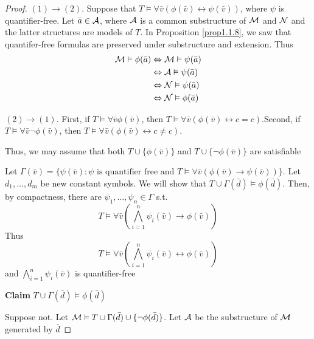 \documentclass[11pt]{article}
\begin{document}
\begin{proof}
\((1)\to(2)\). Suppose that \(T\vDash\forall\bar{v}(\phi(\bar{v})\leftrightarrow\psi(\bar{v}))\),
where \(\psi\) is quantifier-free. Let \(\bar{a}\in\mathcal{A}\), where \(\mathcal{A}\) is a
common substructure of \(\mathcal{M}\) and \(\mathcal{N}\) and the latter structures are
models of \(T\). In Proposition \ref{prop1.1.8}, we saw that quantifer-free
formulas are preserved under substructure and extension. Thus
\begin{align*}
\mathcal{M}\vDash\phi(\bar{a})&\Leftrightarrow\mathcal{M}\vDash\psi(\bar{a})\\
&\Leftrightarrow\mathcal{A}\vDash\psi(\bar{a})\\
&\Leftrightarrow\mathcal{N}\vDash\psi(\bar{a})\\
&\Leftrightarrow\mathcal{N}\vDash\phi(\bar{a})
\end{align*}

\((2)\to(1)\). First, if \(T\vDash\forall\bar{v}\phi(\bar{v})\), then
\(T\vDash\forall\bar{v}(\phi(\bar{v})\leftrightarrow c=c)\).Second, if
\(T\vDash\forall\bar{v}\neg\phi(\bar{v})\), then
\(T\vDash\forall\bar{v}(\phi(\bar{v})\leftrightarrow c\neq c)\).

Thus, we may assume that both \(T\cup\{\phi(\bar{v})\}\) and \(T\cup\{\neg\phi(\bar{v})\}\)
are satisfiable

Let  \(\Gamma(\bar{v})=\{\psi(\bar{v}):\psi\text{ is quantifier free and }T\vDash\forall\bar{v}(\phi(\bar{v})\to\psi(\bar{v}))\}\).
Let \(d_1,\dots,d_m\) be new constant symbols. We will show that \(T\cup\Gamma(\bar{d})\vDash\phi(\bar{d})\). Then, by
compactness, there are  \(\psi_1,\dots,\psi_n\in\Gamma\) s.t. \label{Problem2}
\begin{equation*}
T\vDash\forall\bar{v}\left(\displaystyle\bigwedge_{i=1}^n\psi_i(\bar{v})\to\phi(\bar{v})
\right)
\end{equation*}
Thus
\begin{equation*}
T\vDash\forall\bar{v}\left(\displaystyle\bigwedge_{i=1}^n\psi_i(\bar{v})\leftrightarrow
\phi(\bar{v})
\right)
\end{equation*}
and \(\displaystyle\bigwedge_{i=1}^n\psi_i(\bar{v})\) is quantifier-free

\textbf{Claim} \(T\cup\Gamma(\bar{d})\vDash\phi(\bar{d})\)

Suppose not. Let \(\mathcal{M}\vDash T\cup\Gamma(\bar{d})\cup\{\neg\phi(\bar{d})\}\). Let \(\mathcal{A}\)
be the substructure of \(\mathcal{M}\) generated by \(\bar{d}\)


\end{proof}
\end{document}
